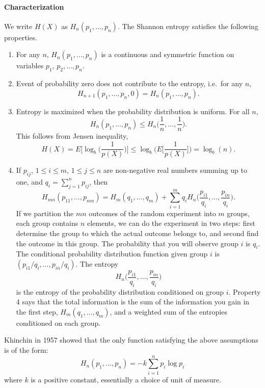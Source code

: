 \documentclass[12pt]{article}
\begin{document}
\paragraph{Characterization}

We write $H(X)$ as $H_n(p_1,\ldots,p_n)$. The Shannon entropy
satisfies the following properties.

\begin{enumerate}
\item For any $n$, $H_n(p_1,\ldots,p_n)$ is a continuous and
symmetric function on variables $p_1$, $p_2,\ldots, p_n$.

\item Event of probability zero does not contribute to the entropy, i.e.\
for any $n$,
\[
 H_{n+1}(p_1,\ldots,p_n,0) = H_n(p_1,\ldots,p_n).
\]

\item Entropy is maximized when the probability distribution is
uniform. For all $n$,
\[
H_n(p_1,\ldots,p_n) \leq H_n\Big(\frac{1}{n},\ldots,\frac{1}{n}
\Big).
\]
This follows from Jensen inequality,
\[
   H(X) = E\Big[\log_b \Big( \frac{1}{p(X)}\Big) \Big] \leq
   \log_b \Big( E\Big[ \frac{1}{p(X)} \Big] \Big) = \log_b(n).
\]


\item If $p_{ij}$, $1\leq i \leq m$, $1\leq j \leq n$ are
non-negative real numbers summing up to one, and $q_i =
\sum_{j=1}^n p_{ij}$, then
\[
 H_{mn}(p_{11},\ldots, p_{mn}) = H_m(q_1,\ldots,q_m) +
 \sum_{i=1}^m q_i H_n\Big(\frac{p_{i1}}{q_i},\ldots, \frac{p_{in}}{q_i}
 \Big).
\]
If we partition the $mn$ outcomes of the random experiment into
$m$ groups, each group contains $n$ elements, we can do the
experiment in two steps: first determine the group to which the
actual outcome belongs to, and second find the outcome in this
group. The probability that you will observe group $i$ is $q_i$.
The conditional probability distribution function given group $i$
is $(p_{i1}/q_i,\ldots,p_{in}/q_i)$. The entropy
\[
 H_n\Big(\frac{p_{i1}}{q_i},\ldots, \frac{p_{in}}{q_i} \Big)
\]
is the entropy of the probability distribution conditioned on
group $i$. Property 4 says that the total information is the sum
of the information you gain in the first step, $H_m(q_1,\ldots,
q_m)$, and a weighted sum of the entropies conditioned on each
group.
\end{enumerate}


Khinchin in 1957 showed that the only function satisfying the
above assumptions is of the form:
\begin{displaymath}
H_n(p_1,\ldots,p_n) = -k \sum_{i=1}^n p_i \log p_i
\end{displaymath}
where $k$ is a positive constant, essentially a choice of unit of
measure.
\end{document}
